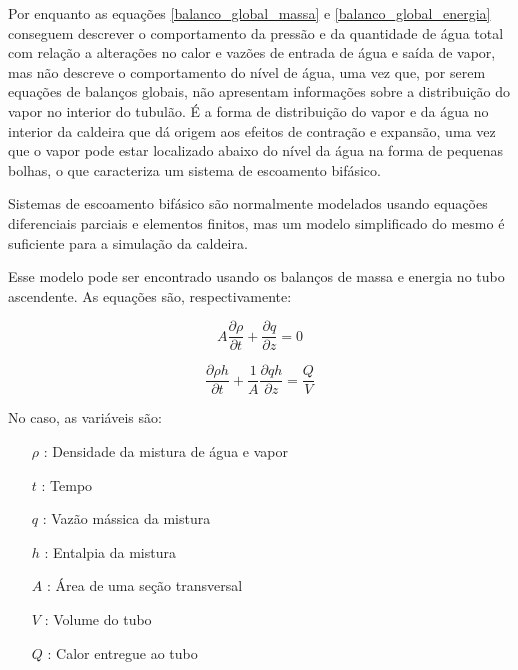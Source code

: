 Por enquanto as equações \ref{balanco_global_massa} e
\ref{balanco_global_energia} conseguem descrever o comportamento da
pressão e da quantidade de água total com relação a alterações no
calor e vazões de entrada de água e saída de vapor, mas não descreve o
comportamento do nível de água, uma vez que, por serem equações de
balanços globais, não apresentam informações sobre a distribuição do
vapor no interior do tubulão. É a forma de distribuição do vapor e da
água no interior da caldeira que dá origem aos efeitos de contração
e expansão, uma vez que o vapor pode estar localizado abaixo do nível
da água na forma de pequenas bolhas, o que caracteriza um sistema de
escoamento bifásico.

Sistemas de escoamento bifásico são normalmente modelados usando
equações diferenciais parciais e elementos finitos, mas um modelo
simplificado do mesmo é suficiente para a simulação da caldeira.

Esse modelo pode ser encontrado usando os balanços de massa e energia
no tubo ascendente. As equações são, respectivamente:

\begin{equation}
  A\dfrac{\partial \rho} {\partial t} + \dfrac{\partial q}{\partial z}
  = 0
  \label{balanco_massa_riser}
\end{equation}

\begin{equation}
  \dfrac{\partial \rho h}{\partial t} + \dfrac{1}{A} \dfrac{\partial q
    h}{\partial z} = \dfrac{Q}{V}
  \label{balanco_energia_riser}
\end{equation}

No caso, as variáveis são:
\begin{itemize}
\item[$ \rho $]: Densidade da mistura de água e vapor
\item[$ t $]: Tempo
\item[$ q $]: Vazão mássica da mistura
\item[$ h $]: Entalpia da mistura
\item[$ A $]: Área de uma seção transversal
\item[$ V $]: Volume do tubo
\item[$ Q $]: Calor entregue ao tubo
\end{itemize}

